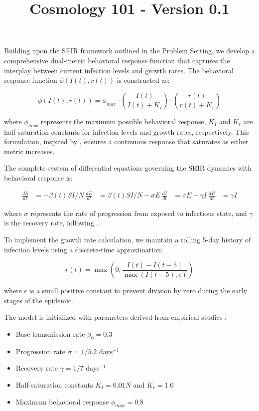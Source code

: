 \documentclass{article}\usepackage{graphicx} \usepackage{amsmath} \usepackage{colortbl}\title{Cosmology 101 - Version 0.1}
\begin{document}
Building upon the SEIR framework outlined in the Problem Setting, we develop a comprehensive dual-metric behavioral response function that captures the interplay between current infection levels and growth rates. The behavioral response function $\phi(I(t), r(t))$ is constructed as:


\begin{equation}
\phi(I(t), r(t)) = \phi_{max} \cdot \left(\frac{I(t)}{I(t) + K_I}\right) \cdot \left(\frac{r(t)}{r(t) + K_r}\right)
\end{equation}

where $\phi_{max}$ represents the maximum possible behavioral response, $K_I$ and $K_r$ are half-saturation constants for infection levels and growth rates, respectively. This formulation, inspired by \citet{funk2010modelling}, ensures a continuous response that saturates as either metric increases.

The complete system of differential equations governing the SEIR dynamics with behavioral response is:

\begin{align}
\frac{dS}{dt} &= -\beta(t)SI/N \
\frac{dE}{dt} &= \beta(t)SI/N - \sigma E \
\frac{dI}{dt} &= \sigma E - \gamma I \
\frac{dR}{dt} &= \gamma I
\end{align}

where $\sigma$ represents the rate of progression from exposed to infectious state, and $\gamma$ is the recovery rate, following \citet{anderson1992infectious}.

To implement the growth rate calculation, we maintain a rolling 5-day history of infection levels using a discrete-time approximation:

\begin{equation}
r(t) = \max\left(0, \frac{I(t) - I(t-5)}{\max(I(t-5), \epsilon)}\right)
\end{equation}

where $\epsilon$ is a small positive constant to prevent division by zero during the early stages of the epidemic.

The model is initialized with parameters derived from empirical studies \cite{hethcote2000mathematics}:
\begin{itemize}
\item Base transmission rate $\beta_0 = 0.3$
\item Progression rate $\sigma = 1/5.2$ days$^{-1}$
\item Recovery rate $\gamma = 1/7$ days$^{-1}$
\item Half-saturation constants $K_I = 0.01N$ and $K_r = 1.0$
\item Maximum behavioral response $\phi_{max} = 0.8$
\end{itemize}
\end{document}

